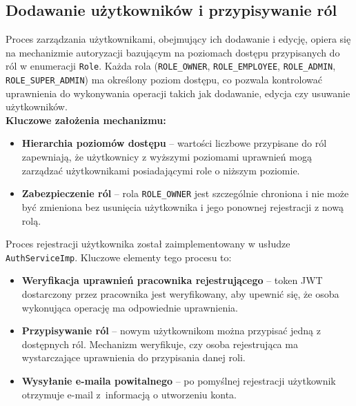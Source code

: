 \subsection{Dodawanie użytkowników i przypisywanie ról}

Proces zarządzania użytkownikami, obejmujący ich dodawanie i edycję, opiera się na mechanizmie autoryzacji bazującym na poziomach dostępu przypisanych do ról w enumeracji \texttt{Role}. Każda rola (\texttt{ROLE\_OWNER}, \texttt{ROLE\_EMPLOYEE}, \texttt{ROLE\_ADMIN}, \texttt{ROLE\_SUPER\_ADMIN}) ma określony poziom dostępu, co pozwala kontrolować uprawnienia do wykonywania operacji takich jak dodawanie, edycja czy usuwanie użytkowników.\\[-10pt]

\textbf{Kluczowe założenia mechanizmu:}
\begin{itemize}
    \item \textbf{Hierarchia poziomów dostępu} -- wartości liczbowe przypisane do ról zapewniają, że użytkownicy z wyższymi poziomami uprawnień mogą zarządzać użytkownikami posiadającymi role o niższym poziomie.
    \item \textbf{Zabezpieczenie ról} -- rola \texttt{ROLE\_OWNER} jest szczególnie chroniona i nie może być zmieniona bez usunięcia użytkownika i jego ponownej rejestracji z nową rolą.
\end{itemize}

Proces rejestracji użytkownika został zaimplementowany w usłudze \texttt{AuthServiceImp}. Kluczowe elementy tego procesu to:
\begin{itemize}
    \item \textbf{Weryfikacja uprawnień pracownika rejestrującego} -- token JWT dostarczony przez pracownika jest weryfikowany, aby upewnić się, że osoba wykonująca operację ma odpowiednie uprawnienia.
    \item \textbf{Przypisywanie ról} -- nowym użytkownikom można przypisać jedną z dostępnych ról. Mechanizm weryfikuje, czy osoba rejestrująca ma wystarczające uprawnienia do przypisania danej roli.
    \item \textbf{Wysyłanie e-maila powitalnego} -- po pomyślnej rejestracji użytkownik otrzymuje e-mail z~informacją o utworzeniu konta.
\end{itemize}

